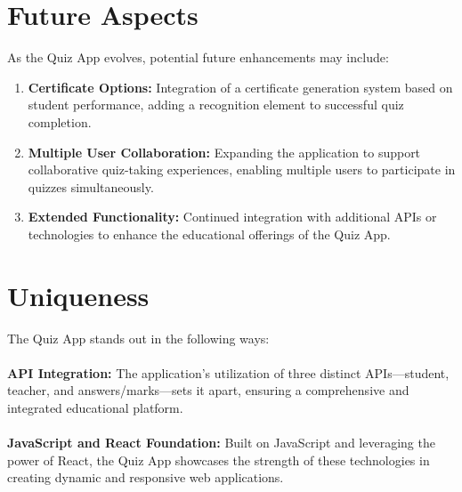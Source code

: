 \section{Future Aspects}
As the Quiz App evolves, potential future enhancements may include:

\begin{enumerate}
    \item \textbf{Certificate Options:} Integration of a certificate generation system based on student performance, adding a recognition element to successful quiz completion.

    \item \textbf{Multiple User Collaboration:} Expanding the application to support collaborative quiz-taking experiences, enabling multiple users to participate in quizzes simultaneously.

    \item \textbf{Extended Functionality:} Continued integration with additional APIs or technologies to enhance the educational offerings of the Quiz App.

\end{enumerate}

\section{Uniqueness}
The Quiz App stands out in the following ways:

\large{\paragraph{}}

\textbf{API Integration:} The application's utilization of three distinct APIs—student, teacher, and answers/marks—sets it apart, ensuring a comprehensive and integrated educational platform.

\large{\paragraph{}}

\textbf{JavaScript and React Foundation:} Built on JavaScript and leveraging the power of React, the Quiz App showcases the strength of these technologies in creating dynamic and responsive web applications.

\large{\paragraph{}}

